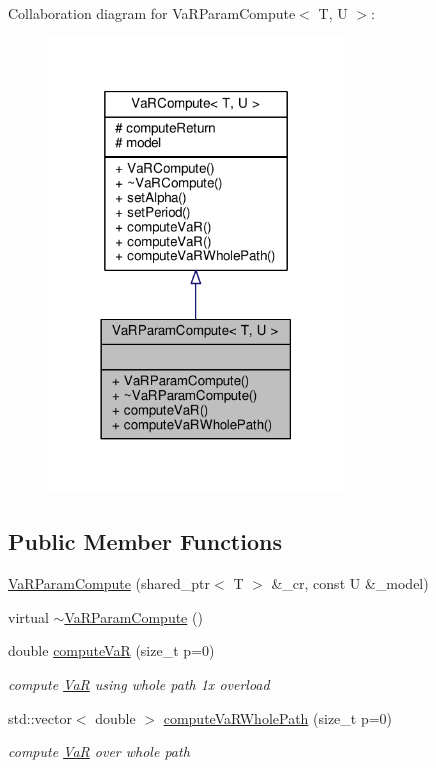 Collaboration diagram for Va\+R\+Param\+Compute$<$ T, U $>$\+:
\nopagebreak
\begin{figure}[H]
\begin{center}
\leavevmode
\includegraphics[width=222pt]{classVaRParamCompute__coll__graph}
\end{center}
\end{figure}
\subsection*{Public Member Functions}
\begin{DoxyCompactItemize}
\item 
\hyperlink{classVaRParamCompute_a43e231d21477bb07cb41f39996d5a993}{Va\+R\+Param\+Compute} (shared\+\_\+ptr$<$ T $>$ \&\+\_\+cr, const U \&\+\_\+model)
\item 
virtual \hyperlink{classVaRParamCompute_ac1c0c92954f1a6951d9355dccfa7ebcd}{$\sim$\+Va\+R\+Param\+Compute} ()
\item 
double \hyperlink{classVaRParamCompute_a0dcd8d0204328a73526aeb3859b3e159}{compute\+VaR} (size\+\_\+t p=0)
\begin{DoxyCompactList}\small\item\em compute \hyperlink{classVaR}{VaR} using whole path 1x overload \end{DoxyCompactList}\item 
std\+::vector$<$ double $>$ \hyperlink{classVaRParamCompute_abc97057d7e35d8dc98fb3a560be67d0d}{compute\+Va\+R\+Whole\+Path} (size\+\_\+t p=0)
\begin{DoxyCompactList}\small\item\em compute \hyperlink{classVaR}{VaR} over whole path \end{DoxyCompactList}\end{DoxyCompactItemize}

